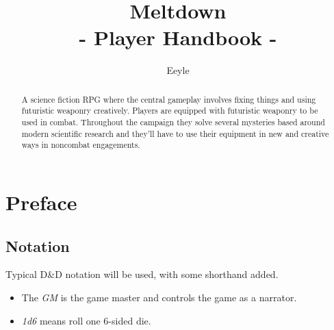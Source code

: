 \documentclass[a4paper]{article}
\title{Meltdown \\ {\large - Player Handbook -}}
\author{Eeyle}
\date{}
\begin{document}
\maketitle

\begin{abstract}

A science fiction RPG where the central gameplay involves fixing things and using futuristic weaponry creatively. Players are equipped with futuristic weaponry to be used in combat. Throughout the campaign they solve several mysteries based around modern scientific research and they'll have to use their equipment in new and creative ways in noncombat engagements.


\end{abstract}

{
  \hypersetup{linkcolor=black}
  \setcounter{tocdepth}{2}
  \tableofcontents
}

\section{Preface} \label{preface}

\subsection{Notation} \label{preface_notation}
Typical D\&D notation will be used, with some shorthand added. 
\begin{itemize}
\item The \textit{GM} is the game master and controls the game as a narrator.
\item \textit{1d6} means roll one 6-sided die.
\end{itemize}
\end{document}

